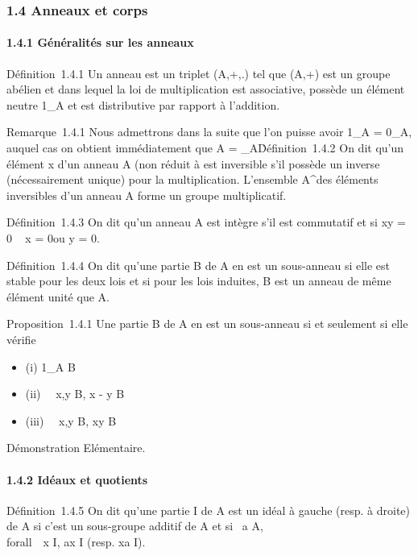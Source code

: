 
\subsubsection{1.4 Anneaux et corps}

\paragraph{1.4.1 Généralités sur les anneaux}

Définition~1.4.1 Un anneau est un triplet (A,+,.) tel que (A,+) est un
groupe abélien et dans lequel la loi de multiplication est associative,
possède un élément neutre 1_A et est distributive par rapport à
l'addition.

Remarque~1.4.1 Nous admettrons dans la suite que l'on puisse avoir
1_A = 0_A, auquel cas on obtient immédiatement que A =
\0_A\.

Définition~1.4.2 On dit qu'un élément x d'un anneau A (non réduit à
\0\) est inversible s'il possède un
inverse (nécessairement unique) pour la multiplication. L'ensemble
A^\times des éléments inversibles d'un anneau A forme un groupe
multiplicatif.

Définition~1.4.3 On dit qu'un anneau A est intègre s'il est commutatif
et si xy = 0 \rigtharrow~ x = 0\text ou y = 0.

Définition~1.4.4 On dit qu'une partie B de A en est un sous-anneau si
elle est stable pour les deux lois et si pour les lois induites, B est
un anneau de même élément unité que A.

Proposition~1.4.1 Une partie B de A en est un sous-anneau si et
seulement si elle vérifie

\begin{itemize}
\itemsep1pt\parskip0pt
\item
  (i) 1_A \in B
\item
  (ii) \forall~~x,y \in B, x - y \in B
\item
  (iii) \forall~~x,y \in B, xy \in B
\end{itemize}

Démonstration Elémentaire.

\paragraph{1.4.2 Idéaux et quotients}

Définition~1.4.5 On dit qu'une partie I de A est un idéal à gauche
(resp. à droite) de A si c'est un sous-groupe additif de A et si
\forall~a \in A,\\forall~~x \in I, ax \in
I (resp. xa \in I).

